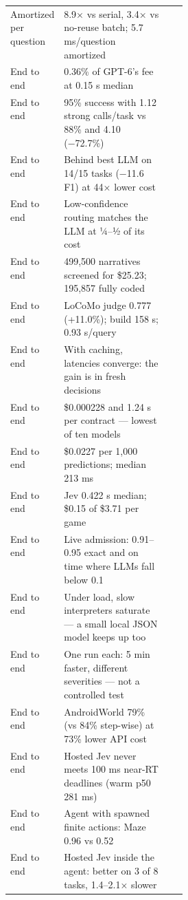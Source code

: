 \begin{table}[tbp]
\begin{tabularx}{\linewidth}{p{0.2\linewidth}Xp{0.1\linewidth}}
Amortized per question & 8.9× vs serial, 3.4× vs no-reuse batch; 5.7 ms/\allowbreak{}question amortized & \citep{arxiv2609_25845} \\
End to end & 0.36\% of GPT-6’s fee at 0.15 s median & \citep{arxiv2609_26550} \\
End to end & 95\% success with 1.12 strong calls/\allowbreak{}task vs 88\% and 4.10 (−72.7\%) & \citep{arxiv2609_26532} \\
End to end & Behind best LLM on 14/\allowbreak{}15 tasks (−11.6 F1) at 44× lower cost & \citep{arxiv2609_24574} \\
End to end & Low-confidence routing matches the LLM at ¼–½ of its cost & \citep{arxiv2609_24574} \\
End to end & 499,500 narratives screened for \$25.23; 195,857 fully coded & \citep{arxiv2609_24052} \\
End to end & LoCoMo judge 0.777 (+11.0\%); build 158 s; 0.93 s/\allowbreak{}query & \citep{arxiv2609_23986} \\
End to end & With caching, latencies converge: the gain is in fresh decisions & \citep{arxiv2609_22753} \\
End to end & \$0.000228 and 1.24 s per contract — lowest of ten models & \citep{arxiv2609_27678} \\
End to end & \$0.0227 per 1,000 predictions; median 213 ms & \citep{arxiv2609_27535} \\
End to end & Jev 0.422 s median; \$0.15 of \$3.71 per game & \citep{arxiv2609_27331} \\
End to end & Live admission: 0.91–0.95 exact and on time where LLMs fall below 0.1 & \citep{arxiv2609_22753} \\
End to end & Under load, slow interpreters saturate — a small local JSON model keeps up too & \citep{arxiv2609_23136} \\
End to end & One run each: 5 min faster, different severities — not a controlled test & \citep{arxiv2609_28940} \\
End to end & AndroidWorld 79\% (vs 84\% step-wise) at 73\% lower API cost & \citep{arxiv2609_30186} \\
End to end & Hosted Jev never meets 100 ms near-RT deadlines (warm p50 281 ms) & \citep{arxiv2609_33689} \\
End to end & Agent with spawned finite actions: Maze 0.96 vs 0.52 & \citep{arxiv2610_00437} \\
End to end & Hosted Jev inside the agent: better on 3 of 8 tasks, 1.4–2.1× slower & \citep{arxiv2610_00437} \\

\end{tabularx}
\end{table}
